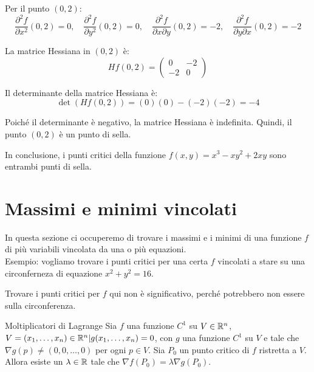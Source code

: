 Per il punto $(0,2)$:
\[
\frac{\partial^2 f}{\partial x^2}(0,2) = 0, \quad \frac{\partial^2 f}{\partial y^2}(0,2) = 0, \quad \frac{\partial^2 f}{\partial x \partial y}(0,2) = -2, \quad \frac{\partial^2 f}{\partial y \partial x}(0,2) = -2
\]

La matrice Hessiana in $(0,2)$ è:
\[
Hf(0,2) = \begin{pmatrix}
0 & -2 \\
-2 & 0
\end{pmatrix}
\]

Il determinante della matrice Hessiana è:
\[
\det(Hf(0,2)) = (0)(0) - (-2)(-2) = -4
\]

Poiché il determinante è negativo, la matrice Hessiana è indefinita. Quindi, il punto $(0,2)$ è un punto di sella.

In conclusione, i punti critici della funzione $f(x,y) = x^3 - xy^2 + 2xy$ sono entrambi punti di sella.

\section{Massimi e minimi vincolati}
In questa sezione ci occuperemo di trovare i massimi e i minimi di una funzione $f$ di più variabili vincolata da una o più equazioni.\\
Esempio: vogliamo trovare i punti critici per una certa $f$ vincolati a stare su una circonferneza di equazione $x^2 + y^2 = 16$.

\begin{osservazione}{}
  Trovare i punti critici per $f$ qui non è significativo, perché potrebbero non essere sulla circonferenza.
\end{osservazione}

\begin{teorema}{Moltiplicatori di Lagrange}
  Sia $f$ una funzione $C^1$ su $V\in \mathbb{R}^n$, $V={(x_1, \dots, x_n)\in \mathbb{R}^n | g(x_1, \dots, x_n) = 0}$, con $g$ una funzione $C^1$ su $V$ e tale che $\nabla g(p) \neq (0, 0, \dots, 0)$ per ogni $p \in V$. Sia $P_0$ un punto critico di $f$ ristretta a $V$. Allora esiste un $\lambda \in \mathbb{R}$ tale che $\nabla f(P_0) = \lambda \nabla g(P_0)$.
\end{teorema}


